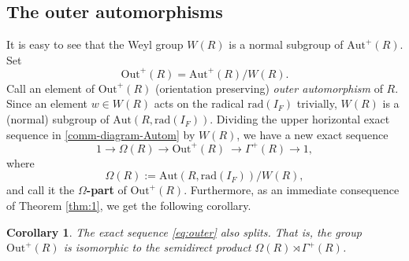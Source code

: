 \documentclass[11pt]{amsart}
\newtheorem{cor}[thm]{Corollary}%
\begin{document}
\subsection{The outer automorphisms}

It is easy to see that the Weyl group $W(R)$ is a normal subgroup of 
$\mathrm{Aut}^+(R)$. Set 
\[\mathrm{Out}^+(R)=\mathrm{Aut}^+(R)/W(R). \]
Call an element of $\mathrm{Out}^+(R)$ (orientation preserving) {\it outer
automorphism} of $R$. Since an element $w\in W(R)$ acts on the radical
$\mathrm{rad}(I_F)$ trivially, $W(R)$ is a (normal) subgroup of  
$\mathrm{Aut}(R,\mathrm{rad}(I_F))$. Dividing the upper horizontal exact sequence 
in \eqref{comm-diagram-Autom} by $W(R)$, we have a new exact sequence
\begin{equation}\label{eq:outer}
1  \longrightarrow  \Omega(R)\longrightarrow \mathrm{Out}^+(R) \ 
\longrightarrow \Gamma^+(R) \longrightarrow  1 ,
\end{equation}
where
\[\Omega(R):=\mathrm{Aut}(R,\mathrm{rad}({I_F}))/W(R),\]
and call it the {\bf $\Omega$-part} of $\mathrm{Out}^+(R)$.  
Furthermore, as an immediate 
consequence of Theorem \ref{thm:1}, we get the following corollary.
\begin{cor}
The exact sequence \eqref{eq:outer} also splits. That is, the group 
$\mathrm{Out}^+(R)$ is isomorphic to the
semidirect product $\Omega(R)\rtimes\Gamma^+(R)$. 
\end{cor}
\end{document}
